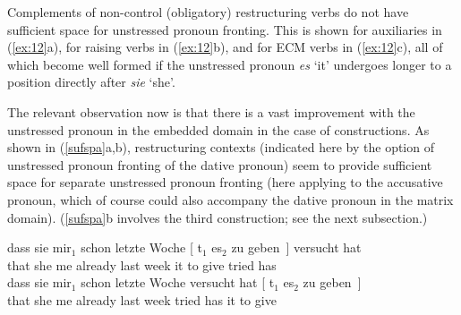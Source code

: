 \documentclass[output=paper]{langsci/langscibook}
\begin{document}
Complements of non-control (obligatory) restructuring verbs do not have
sufficient space for unstressed pronoun fronting. This is shown for auxiliaries
in (\ref{ex:12}a), for raising verbs in (\ref{ex:12}b), and for ECM verbs in
(\ref{ex:12}c), all of which become well formed if the unstressed pronoun {\it
es} \enquote*{it} undergoes longer  to a position directly after {\itshape sie}
\enquote*{she}.

\ea\label{ex:12} 
    \z
\z

The relevant observation now is that there is a vast improvement with the
unstressed pronoun in the embedded domain in the case of  constructions.
As shown in (\ref{sufspa}a,b), restructuring contexts (indicated here by the
option of unstressed pronoun fronting of the dative pronoun)  seem to provide
sufficient space for separate unstressed pronoun fronting (here applying to the
accusative pronoun, which of course could also accompany the dative pronoun in
the matrix domain).  (\ref{sufspa}b involves the third construction; see the
next subsection.)

\ea\label{sufspa} 
    \ea \gll dass sie  mir$_1$ schon letzte Woche [ t$_1$ es$_2$ zu geben~]
    versucht hat\\
    that she\textsubscript{\Nom} me\textsubscript{\Dat} already last week {} {} it\textsubscript{\Acc} to give tried has\\
    \ex \gll dass sie  mir$_1$ schon letzte Woche versucht hat [ t$_1$ es$_2$ zu
      geben~]\\
    that she\textsubscript{\Nom} me\textsubscript{\Dat} already last week tried has {} {} it\textsubscript{\Acc} to
    give\\
    \z
\z
\end{document}
